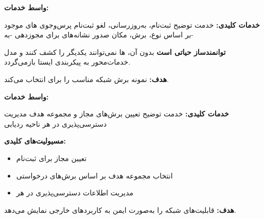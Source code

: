 \textbf{واسط خدمات:} 

\textbf{خدمات کلیدی:}\CNbr{}\lr{\textbar{}} خدمت \lr{\textbar{}} توضیح \lr{\textbar{}}\CNbr{}\CNbr{} ثبت‌نام، به‌روزرسانی، لغو ثبت‌نام  \lr{\textbar{}}\CNbr{} پرس‌وجوی های موجود بر اساس نوع، برش، مکان \lr{\textbar{}}\CNbr{} صدور نشانه‌های  برای مجوزدهی -به- \lr{\textbar{}}

\begin{CNquote}

\lr{\mbox{\CNstar{}}} \textbf{ توانمندساز حیاتی  است}  بدون آن، ها نمی‌توانند یکدیگر را کشف کنند و مدل خدمات‌محور به پیکربندی ایستا بازمی‌گردد.

\end{CNquote}


\textbf{هدف:} نمونه برش شبکه مناسب را برای  انتخاب می‌کند.

\textbf{واسط خدمات:} 

\textbf{خدمات کلیدی:}\CNbr{}\lr{\textbar{}} خدمت \lr{\textbar{}} توضیح \lr{\textbar{}}\CNbr{}\CNbr{} تعیین برش‌های مجاز و مجموعه  هدف \lr{\textbar{}}\CNbr{} مدیریت دسترسی‌پذیری  در هر ناحیه ردیابی \lr{\textbar{}}

\textbf{مسیولیت‌های کلیدی:}

\begin{itemize}
\tightlist
\item
  تعیین  مجاز برای ثبت‌نام 
\item
  انتخاب مجموعه  هدف بر اساس برش‌های درخواستی
\item
  مدیریت اطلاعات دسترسی‌پذیری  در هر 
\end{itemize}


\textbf{هدف:} قابلیت‌های شبکه  را به‌صورت ایمن به کاربردهای خارجی نمایش می‌دهد.


